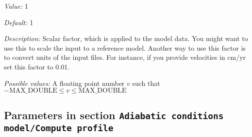 \begin{itemize}
{\it Value:} 1


{\it Default:} 1


{\it Description:} Scalar factor, which is applied to the model data. You might want to use this to scale the input to a reference model. Another way to use this factor is to convert units of the input files. For instance, if you provide velocities in cm/yr set this factor to 0.01.


{\it Possible values:} A floating point number $v$ such that $-\text{MAX\_DOUBLE} \leq v \leq \text{MAX\_DOUBLE}$
\end{itemize}

\subsection{Parameters in section \tt Adiabatic conditions model/Compute profile}
\label{parameters:Adiabatic_20conditions_20model/Compute_20profile}

